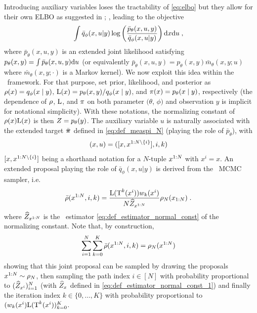 \documentclass{article}
\begin{document}
Introducing auxiliary variables loses the tractability of \eqref{eq:elbo} but they allow for their own ELBO as suggested in \cite{agakov2004auxiliary}; \cite{lawson2019energy}, leading to the objective
\begin{equation}\label{eq:AVI_ELBO}
\int \bar{q}_\phi(x,u|y) \log \left( \frac{\bar{p}_\theta(x,u,y)}{\bar{q}_\phi(x,u|y)} \right)  \mathrm{d} x \mathrm{d} u \;,
\end{equation}
where $\bar{p}_\theta(x,u,y)$ is an extended joint likelihood satisfying $p_\theta(x,y)= \int \bar{p}_\theta(x,u,y) \mathrm{d} u$ (or equivalently $\bar{p}_\theta(x,u,y)= p_\theta(x,y) \bar{m}_\theta(x,y; u)$ where $\bar{m}_\theta(x,y;\cdot)$ is a Markov kernel).
We now exploit this idea within the \IFIS\ framework. For that purpose, set prior, likelihood, and posterior as $\rho(x)=q_\phi(x\mid y)$, $\mathrm{L}(x)= p_\theta(x,y)/ q_\phi(x \mid y)$, and $\pi(x)=p_{\theta}(x\mid y)$, respectively (the dependence of $\rho$, $\mathrm{L}$, and $\pi$ on both parameter $(\theta$, $\phi)$ and observation $y$ is implicit for notational simplicity). With these notations, the normalizing constant of $\rho(x) \mathrm{L}(x)$ is then  $Z= p_\theta(y)$. The auxiliary variable $u$ is naturally associated with the extended target $\bar{\boldsymbol{\pi}}$ defined in \eqref{eq:def_measpi_N} (playing the role of $\bar{p}_\theta$), with
$$(x,u)=([x,x^{1:N \setminus \{i\}}],i,k)$$
$[x,x^{1:N \setminus \{i\}}]$ being a shorthand notation for a $N$-tuple $x^{1:N}$ with $x^i= x$. An extended proposal playing the role of $ \bar{q}_\phi(x,u|y)$ is derived from the \IFIS~MCMC sampler, i.e.
\begin{equation}
\label{eq:proposal-extended}
\bar{\rho}(x^{1:N},i,k)=  \frac{\mathrm{L}(\operatorname{T}^k(x^i)) w_k(x^i)}{N \widehat{Z}_{x^{1:N}}} \rho_N(x_{1:N})  \;.
\end{equation}
where $\widehat{Z}_{x^{1:N}}$ is the \IFIS\ estimator \eqref{eq:def_estimator_normal_const} of the normalizing constant.
Note that, by construction, 
\begin{equation}
\label{eq:expression-marginal}
\sum_{i=1}^N \sum_{k=0}^K \bar{\rho}(x^{1:N},i,k) = \rho_N(x^{1:N})
\end{equation}
showing that this joint proposal can be sampled by drawing the proposals $x^{1:N} \sim \rho_N$, then sampling the path index $i \in [N]$ with probability proportional to $(\widehat{Z}_{x^i})_{i=1}^N$ (with $\widehat{Z}_{x}$ defined in \eqref{eq:def_estimator_normal_const_1}) and finally the iteration index $k \in \{0,\dots,K\}$ with probability proportional to $(w_k(x^{i})\mathrm{L}(\operatorname{T}^k(x^{i}))_{k=0}^K$.
\end{document}
